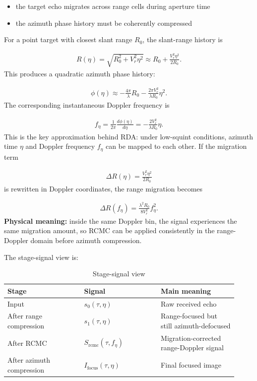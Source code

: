 \documentclass[journal,onecolumn]{IEEEtran}
\begin{document}
\begin{itemize}
  \item the target echo migrates across range cells during aperture time
  \item the azimuth phase history must be coherently compressed
\end{itemize}
For a point target with closest slant range $R_0$, the slant-range history is

\begin{align}
R(\eta)=\sqrt{R_0^2+V_r^2\eta^2} \approx R_0+\frac{V_r^2\eta^2}{2R_0}.
\end{align}
This produces a quadratic azimuth phase history:

\begin{align}
\phi(\eta)\approx -\frac{4\pi}{\lambda}R_0 -\frac{2\pi V_r^2}{\lambda R_0}\eta^2.
\end{align}
The corresponding instantaneous Doppler frequency is

\begin{align}
f_\eta=\frac{1}{2\pi}\frac{d\phi(\eta)}{d\eta} =-\frac{2V_r^2}{\lambda R_0}\eta.
\end{align}
This is the key approximation behind RDA: under low-squint conditions, azimuth time $\eta$ and Doppler frequency $f_\eta$ can be mapped to each other. If the migration term

\begin{align}
\Delta R(\eta)=\frac{V_r^2\eta^2}{2R_0}
\end{align}
is rewritten in Doppler coordinates, the range migration becomes

\begin{align}
\Delta R(f_\eta)=\frac{\lambda^2R_0}{8V_r^2}f_\eta^2.
\end{align}
\textbf{Physical meaning:} inside the same Doppler bin, the signal experiences the same migration amount, so RCMC can be applied consistently in the range-Doppler domain before azimuth compression.

The stage-signal view is:

\begin{table}[H]
\centering
\caption{Stage-signal view}
\label{tab:stage-signal-view}
\begin{tabular}{>{\raggedright\arraybackslash}p{0.307\linewidth}>{\raggedright\arraybackslash}p{0.307\linewidth}>{\raggedright\arraybackslash}p{0.307\linewidth}}
\toprule
Stage & Signal & Main meaning \\
\midrule
Input & $s_0(\tau,\eta)$ & Raw received echo \\
After range compression & $s_1(\tau,\eta)$ & Range-focused but still azimuth-defocused \\
After RCMC & $S_{\mathrm{rcmc}}(\tau,f_\eta)$ & Migration-corrected range-Doppler signal \\
After azimuth compression & $I_{\mathrm{focus}}(\tau,\eta)$ & Final focused image \\
\bottomrule
\end{tabular}
\end{table}
\end{document}
